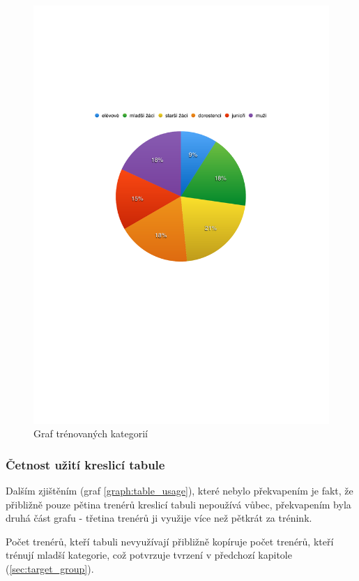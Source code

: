 \documentclass[thesis=B,czech]{FITthesis}[2012/06/26]
\begin{document}
	\begin{figure}
		\centering
		\includegraphics{img/graph_category}
		\caption{Graf trénovaných kategorií}\label{graph:category}
	\end{figure}

\subsubsection{Četnost užití kreslicí tabule}

	Dalším zjištěním (graf \ref{graph:table_usage}), které nebylo překvapením je fakt, že přibližně pouze pětina trenérů kreslicí tabuli nepoužívá vůbec, překvapením byla druhá část grafu \-- třetina trenérů ji využije více než pětkrát za trénink.

	Počet trenérů, kteří tabuli nevyužívají přibližně kopíruje počet trenérů, kteří trénují mladší kategorie, což potvrzuje tvrzení v předchozí kapitole (\ref{sec:target_group}).
\end{document}
